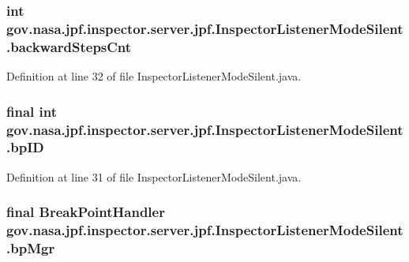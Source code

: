 \subsubsection[{\texorpdfstring{backward\+Steps\+Cnt}{backwardStepsCnt}}]{\setlength{\rightskip}{0pt plus 5cm}int gov.\+nasa.\+jpf.\+inspector.\+server.\+jpf.\+Inspector\+Listener\+Mode\+Silent.\+backward\+Steps\+Cnt\hspace{0.3cm}{\ttfamily [private]}}\hypertarget{classgov_1_1nasa_1_1jpf_1_1inspector_1_1server_1_1jpf_1_1_inspector_listener_mode_silent_a70d97ae5dc8e288d8a07700f77a69ba8}{}\label{classgov_1_1nasa_1_1jpf_1_1inspector_1_1server_1_1jpf_1_1_inspector_listener_mode_silent_a70d97ae5dc8e288d8a07700f77a69ba8}


Definition at line 32 of file Inspector\+Listener\+Mode\+Silent.\+java.

\subsubsection[{\texorpdfstring{bp\+ID}{bpID}}]{\setlength{\rightskip}{0pt plus 5cm}final int gov.\+nasa.\+jpf.\+inspector.\+server.\+jpf.\+Inspector\+Listener\+Mode\+Silent.\+bp\+ID\hspace{0.3cm}{\ttfamily [private]}}\hypertarget{classgov_1_1nasa_1_1jpf_1_1inspector_1_1server_1_1jpf_1_1_inspector_listener_mode_silent_ac8daa3353c593c4626ba1b843322d38d}{}\label{classgov_1_1nasa_1_1jpf_1_1inspector_1_1server_1_1jpf_1_1_inspector_listener_mode_silent_ac8daa3353c593c4626ba1b843322d38d}


Definition at line 31 of file Inspector\+Listener\+Mode\+Silent.\+java.

\subsubsection[{\texorpdfstring{bp\+Mgr}{bpMgr}}]{\setlength{\rightskip}{0pt plus 5cm}final {\bf Break\+Point\+Handler} gov.\+nasa.\+jpf.\+inspector.\+server.\+jpf.\+Inspector\+Listener\+Mode\+Silent.\+bp\+Mgr\hspace{0.3cm}{\ttfamily [private]}}\hypertarget{classgov_1_1nasa_1_1jpf_1_1inspector_1_1server_1_1jpf_1_1_inspector_listener_mode_silent_a6d85b7d10197ad22e1f6a8173fb82423}{}\label{classgov_1_1nasa_1_1jpf_1_1inspector_1_1server_1_1jpf_1_1_inspector_listener_mode_silent_a6d85b7d10197ad22e1f6a8173fb82423}


